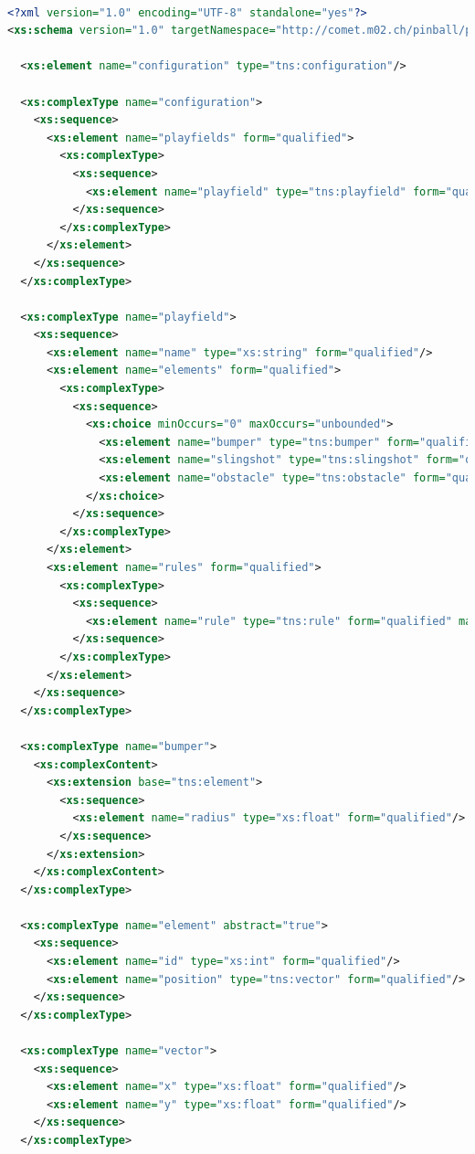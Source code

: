 \documentclass[fontsize=12pt,
               paper=a4,
               twoside=false,
               parskip=half,
               ]{scrartcl}
\begin{document}
\begin{lstlisting}[language=xml,label=lst:default_playfield,caption={schema for playfields.xml}]

<?xml version="1.0" encoding="UTF-8" standalone="yes"?>
<xs:schema version="1.0" targetNamespace="http://comet.m02.ch/pinball/playfield" xmlns:tns="http://comet.m02.ch/pinball/playfield" xmlns:xs="http://www.w3.org/2001/XMLSchema">

  <xs:element name="configuration" type="tns:configuration"/>

  <xs:complexType name="configuration">
    <xs:sequence>
      <xs:element name="playfields" form="qualified">
        <xs:complexType>
          <xs:sequence>
            <xs:element name="playfield" type="tns:playfield" form="qualified" maxOccurs="unbounded"/>
          </xs:sequence>
        </xs:complexType>
      </xs:element>
    </xs:sequence>
  </xs:complexType>

  <xs:complexType name="playfield">
    <xs:sequence>
      <xs:element name="name" type="xs:string" form="qualified"/>
      <xs:element name="elements" form="qualified">
        <xs:complexType>
          <xs:sequence>
            <xs:choice minOccurs="0" maxOccurs="unbounded">
              <xs:element name="bumper" type="tns:bumper" form="qualified"/>
              <xs:element name="slingshot" type="tns:slingshot" form="qualified"/>
              <xs:element name="obstacle" type="tns:obstacle" form="qualified"/>
            </xs:choice>
          </xs:sequence>
        </xs:complexType>
      </xs:element>
      <xs:element name="rules" form="qualified">
        <xs:complexType>
          <xs:sequence>
            <xs:element name="rule" type="tns:rule" form="qualified" maxOccurs="unbounded"/>
          </xs:sequence>
        </xs:complexType>
      </xs:element>
    </xs:sequence>
  </xs:complexType>

  <xs:complexType name="bumper">
    <xs:complexContent>
      <xs:extension base="tns:element">
        <xs:sequence>
          <xs:element name="radius" type="xs:float" form="qualified"/>
        </xs:sequence>
      </xs:extension>
    </xs:complexContent>
  </xs:complexType>

  <xs:complexType name="element" abstract="true">
    <xs:sequence>
      <xs:element name="id" type="xs:int" form="qualified"/>
      <xs:element name="position" type="tns:vector" form="qualified"/>
    </xs:sequence>
  </xs:complexType>

  <xs:complexType name="vector">
    <xs:sequence>
      <xs:element name="x" type="xs:float" form="qualified"/>
      <xs:element name="y" type="xs:float" form="qualified"/>
    </xs:sequence>
  </xs:complexType>


\end{lstlisting}
\end{document}
